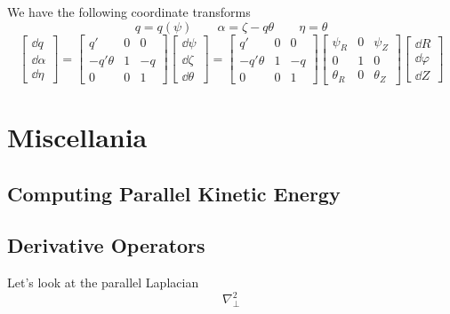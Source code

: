 \documentclass[]{article}
\begin{document}
We have the following coordinate transforms
\begin{equation*}
	q = q(\psi) \qquad \alpha = \zeta - q \theta \qquad \eta = \theta
\end{equation*}
\begin{equation*}
	\begin{bmatrix}
		\dd{q} \\ \dd{\alpha} \\ \dd{\eta}
	\end{bmatrix}
	=
	\begin{bmatrix}
		q' & 0 & 0 \\
		-q' \theta & 1 & -q \\
		0 & 0 & 1
	\end{bmatrix}
	\begin{bmatrix}
		\dd{\psi} \\ \dd{\zeta} \\ \dd{\theta}
	\end{bmatrix}
	=
	\begin{bmatrix}
		q' & 0 & 0 \\
		-q' \theta & 1 & -q \\
		0 & 0 & 1
	\end{bmatrix}
	\begin{bmatrix}
		\psi_R & 0 & \psi_Z \\
		0 & 1 & 0 \\
		\theta_R & 0 & \theta_Z
	\end{bmatrix}
	\begin{bmatrix}
		\dd{R} \\ \dd{\varphi} \\ \dd{Z}
	\end{bmatrix}
\end{equation*}

\section{Miscellania}

\subsection{Computing Parallel Kinetic Energy}


\subsection{Derivative Operators}

Let's look at the parallel Laplacian
\begin{equation*}
	\nabla_\perp^2 
\end{equation*}
\end{document}
